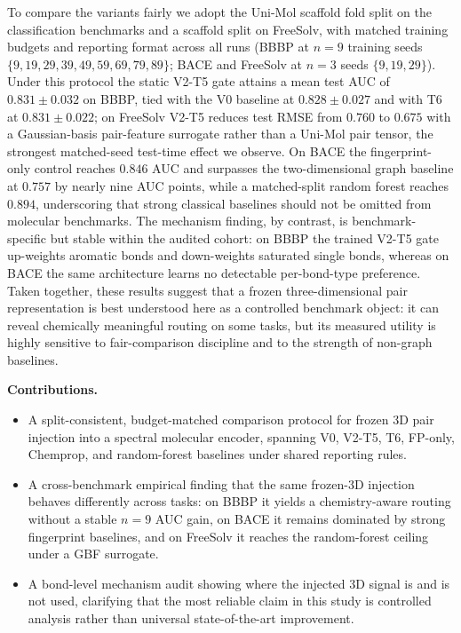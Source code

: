 \documentclass[conference]{IEEEtran}
\begin{document}
To compare the variants fairly we adopt the Uni-Mol scaffold fold split on the classification benchmarks and a scaffold split on FreeSolv, with matched training budgets and reporting format across all runs (BBBP at $n{=}9$ training seeds $\{9, 19, 29, 39, 49, 59, 69, 79, 89\}$; BACE and FreeSolv at $n{=}3$ seeds $\{9, 19, 29\}$). Under this protocol the static V2-T5 gate attains a mean test AUC of $0.831 \pm 0.032$ on BBBP, tied with the V0 baseline at $0.828 \pm 0.027$ and with T6 at $0.831 \pm 0.022$; on FreeSolv V2-T5 reduces test RMSE from $0.760$ to $0.675$ with a Gaussian-basis pair-feature surrogate rather than a Uni-Mol pair tensor, the strongest matched-seed test-time effect we observe. On BACE the fingerprint-only control reaches $0.846$ AUC and surpasses the two-dimensional graph baseline at $0.757$ by nearly nine AUC points, while a matched-split random forest reaches $0.894$, underscoring that strong classical baselines should not be omitted from molecular benchmarks. The mechanism finding, by contrast, is benchmark-specific but stable within the audited cohort: on BBBP the trained V2-T5 gate up-weights aromatic bonds and down-weights saturated single bonds, whereas on BACE the same architecture learns no detectable per-bond-type preference. Taken together, these results suggest that a frozen three-dimensional pair representation is best understood here as a controlled benchmark object: it can reveal chemically meaningful routing on some tasks, but its measured utility is highly sensitive to fair-comparison discipline and to the strength of non-graph baselines.

\noindent\textbf{Contributions.}
\begin{itemize}
  \item A split-consistent, budget-matched comparison protocol for frozen 3D pair injection into a spectral molecular encoder, spanning V0, V2-T5, T6, FP-only, Chemprop, and random-forest baselines under shared reporting rules.
  \item A cross-benchmark empirical finding that the same frozen-3D injection behaves differently across tasks: on BBBP it yields a chemistry-aware routing without a stable $n{=}9$ AUC gain, on BACE it remains dominated by strong fingerprint baselines, and on FreeSolv it reaches the random-forest ceiling under a GBF surrogate.
  \item A bond-level mechanism audit showing where the injected 3D signal is and is not used, clarifying that the most reliable claim in this study is controlled analysis rather than universal state-of-the-art improvement.
\end{itemize}
\end{document}
